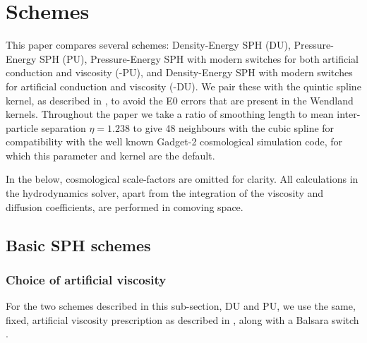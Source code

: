 \section{Schemes}

This paper compares several schemes: Density-Energy SPH (DU), Pressure-Energy
SPH (PU), Pressure-Energy SPH with modern switches for both artificial
conduction and viscosity (\anarchy{}-PU), and Density-Energy SPH with modern
switches for artificial conduction and viscosity (\anarchy{}-DU). We pair these
with the quintic spline kernel, as described in \citet{Dehnen2012}, to avoid
the E0 errors that are present in the Wendland kernels. Throughout the paper
we take a ratio of smoothing length to mean inter-particle separation
$\eta=1.238$ to give 48 neighbours with the cubic spline for compatibility
with the well known Gadget-2 cosmological simulation code, for which this
parameter and kernel are the default.

In the below, cosmological scale-factors are omitted for clarity. All calculations
in the hydrodynamics solver, apart from the integration of the viscosity and
diffusion coefficients, are performed in comoving space.

\subsection{Basic SPH schemes}

\subsubsection{Choice of artificial viscosity}

For the two schemes described in this sub-section, DU and PU, we use the
same, fixed, artificial viscosity prescription as described in \citet{Monaghan1992},
along with a Balsara switch \citet{Balsara1989}.

